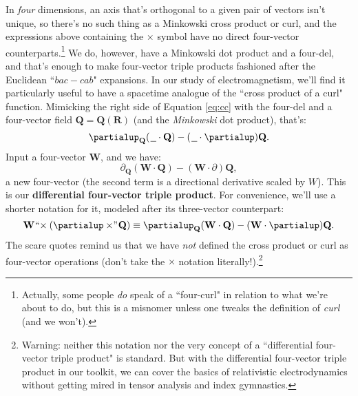 \documentclass[12pt]{article}
\renewcommand{\vv}[1]{\mathbf{#1}}
\begin{document}
In \emph{four} dimensions, an axis that's orthogonal to a given pair of vectors isn't unique, so there's no such thing as a Minkowski cross product or curl, and the expressions above containing the $\times$ symbol have no direct four-vector counterparts.\footnote{Actually, some people \emph{do} speak of a ``four-curl" in relation to what we're about to do, but this is a misnomer unless one tweaks the definition of \emph{curl} (and we won't).} We do, however, have a Minkowski dot product and a four-del, and that's enough to make four-vector triple products fashioned after the Euclidean ``$bac - cab$" expansions. In our study of electromagnetism, we'll find it particularly useful to have a spacetime analogue of the ``cross product of a curl" function. Mimicking the right side of Equation \ref{eq:cc} with the four-del and a four-vector field $\vv Q = \vv Q (\vv R)$ (and the \emph{Minkowski} dot product), that's:
\begin{equation*}
\partialup_{\vv Q} ( \mkern1.5mu \text{\underline{\hspace{.6em}}} \cdot \vv Q) - ( \mkern1.5mu \text{\underline{\hspace{.6em}}} \cdot \partialup) \vv Q .
\end{equation*}
Input a four-vector $\vv W$, and we have:
\begin{equation*}
\partialup_{\vv Q} ( \vv W \cdot \vv Q) - ( \vv W \cdot \partialup) \vv Q ,
\end{equation*}
a new four-vector (the second term is a directional derivative scaled by $W$). This is our \textbf{differential four-vector triple product}. For convenience, we'll use a shorter notation for it, modeled after its three-vector counterpart:
\begin{equation}\label{eq:dtp}
\vv W \mkern1mu `` \mkern-4mu \times (\partialup \times \mkern-4mu " \mkern1mu \vv Q) \equiv \partialup_{\vv Q} ( \vv W \cdot \vv Q) - ( \vv W \cdot \partialup) \vv Q .
\end{equation}
The scare quotes remind us that we have \emph{not} defined the cross product or curl as four-vector operations (don't take the $\times$ notation literally!).\footnote{Warning: neither this notation nor the very concept of a ``differential four-vector triple product" is standard. But with the differential four-vector triple product in our toolkit, we can cover the basics of relativistic electrodynamics without getting mired in tensor analysis and index gymnastics.}
 
\end{document}

